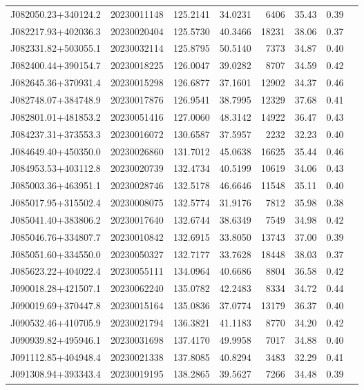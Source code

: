 \documentclass{article}
\begin{document}
\begin {longtable}{|l|l|r|r|r|r|r|l|}
 J082050.23+340124.2&  20230011148&  125.2141&   34.0231&  6406& 35.43& 0.39&\\
 J082217.93+402036.3&  20230020404&  125.5730&   40.3466& 18231& 38.06& 0.37&\\
 J082331.82+503055.1&  20230032114&  125.8795&   50.5140&  7373& 34.87& 0.40&\\
 J082400.44+390154.7&  20230018225&  126.0047&   39.0282&  8707& 34.59& 0.42&\\
 J082645.36+370931.4&  20230015298&  126.6877&   37.1601& 12902& 34.37& 0.46&\\
 J082748.07+384748.9&  20230017876&  126.9541&   38.7995& 12329& 37.68& 0.41&\\
 J082801.01+481853.2&  20230051416&  127.0060&   48.3142& 14922& 36.47& 0.43&\\
 J084237.31+373553.3&  20230016072&  130.6587&   37.5957&  2232& 32.23& 0.40&\\
 J084649.40+450350.0&  20230026860&  131.7012&   45.0638& 16625& 35.44& 0.46&\\
 J084953.53+403112.8&  20230020739&  132.4734&   40.5199& 10619& 34.06& 0.43&\\
 J085003.36+463951.1&  20230028746&  132.5178&   46.6646& 11548& 35.11& 0.40&\\
 J085017.95+315502.4&  20230008075&  132.5774&   31.9176&  7812& 35.98& 0.38&\\
 J085041.40+383806.2&  20230017640&  132.6744&   38.6349&  7549& 34.98& 0.42&\\
 J085046.76+334807.7&  20230010842&  132.6915&   33.8050& 13743& 37.00& 0.39&\\
 J085051.60+334550.0&  20230050327&  132.7177&   33.7628& 18448& 38.03& 0.37&\\
 J085623.22+404022.4&  20230055111&  134.0964&   40.6686&  8804& 36.58& 0.42&\\
 J090018.28+421507.1&  20230062240&  135.0782&   42.2483&  8334& 34.72& 0.44&\\
 J090019.69+370447.8&  20230015164&  135.0836&   37.0774& 13179& 36.37& 0.40&\\
 J090532.46+410705.9&  20230021794&  136.3821&   41.1183&  8770& 34.20& 0.42&\\
 J090939.82+495946.1&  20230031698&  137.4170&   49.9958&  7017& 34.88& 0.40&\\
 J091112.85+404948.4&  20230021338&  137.8085&   40.8294&  3483& 32.29& 0.41&\\
 J091308.94+393343.4&  20230019195&  138.2865&   39.5627&  7266& 34.48& 0.39&\\

\end{longtable}
\end{document}
